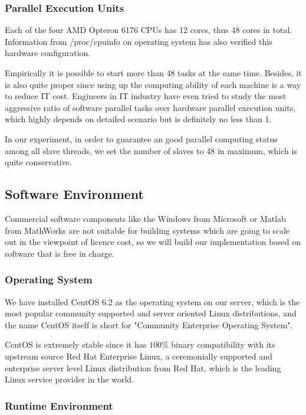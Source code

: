 \subsubsection{Parallel Execution Units}

Each of the four AMD Opteron 6176 CPUs has 12 cores, thus 48 cores in total. Information from /proc/cpuinfo on operating system has also verified this hardware configuration.

Empirically it is possible to start more than 48 tasks at the same time. Besides, it is also quite proper since using up the computing ability of each machine is a way to reduce IT cost. Engineers in IT industry have even tried to study the most aggressive ratio of software parallel tasks over hardware parallel execution units, which highly depends on detailed scenario but is definitely no less than 1.

In our experiment, in order to guarantee an good parallel computing status among all slave threads, we set the number of slaves to 48 in maximum, which is quite conservative.

\subsection{Software Environment}

Commercial software components like the Windows from Microsoft or Matlab from MathWorks are not suitable for building systems which are going to scale out in the viewpoint of licence cost, so we will build our implementation based on software that is free in charge.

\subsubsection{Operating System}

We have installed CentOS 6.2 as the operating system on our server, which is the most popular community supported and server oriented Linux distributions, and the name CentOS itself is short for "Community Enterprise Operating System".

CentOS is extremely stable since it has $100\%$ binary compatibility with its upstream source Red Hat Enterprise Linux, a ceremonially supported and enterprise server level Linux distribution from Red Hat, which is the leading Linux service provider in the world. 

\subsubsection{Runtime Environment}

